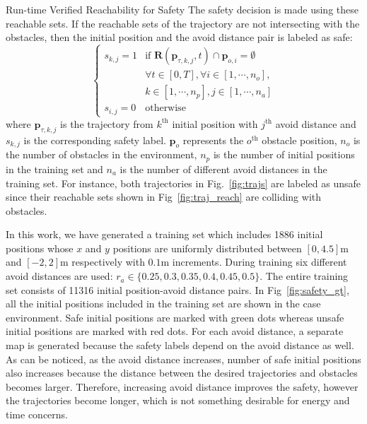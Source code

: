 \begin{section}{Run-time Verified Reachability for Safety}
The safety decision is made using these reachable sets. If the reachable sets of the trajectory are not intersecting with the obstacles, then the initial position and the avoid distance pair is labeled as safe:
\begin{equation}
	\begin{cases}
		s_{k,j} = 1 & \text{if   }  \boldsymbol{R}(\boldsymbol{p}_{\tau, k, j},t) \cap \boldsymbol{p}_{o,i} = \emptyset \\ 
		& \forall t \in [0,T], \forall i \in [1, \cdots, n_o], \\ 
		& k \in [1, \cdots, n_p], j \in  [1, \cdots, n_a] \\
		s_{i,j} = 0 & \text{otherwise}
 	\end{cases}
 	\label{eq:safety}
\end{equation}
where $ \boldsymbol{p}_{\tau,k,j} $ is the trajectory from $ k^{\text{th}} $ initial position with $ j^{\text{th}} $ avoid distance and $ s_{k,j} $ is the corresponding safety label. $ \boldsymbol{p}_o $ represents the $ o^\text{th} $ obstacle position, $ n_o $ is the number of obstacles in the environment, $ n_p $ is the number of initial positions in the training set and $ n_a $ is the number of different avoid distances in the training set. For instance, both trajectories in Fig.~\ref{fig:trajs} are labeled as unsafe since their reachable sets shown in Fig~\ref{fig:traj_reach} are colliding with obstacles.

In this work, we have generated a training set which includes 1886 initial positions whose $ x $ and $ y $ positions are uniformly distributed between $ [0,4.5] $m and $ [-2,2] $m respectively with $ 0.1 $m increments. During training six different avoid distances are used: $ r_a \in \{0.25, 0.3, 0.35, 0.4, 0.45, 0.5\} $. The entire training set consists of 11316 initial position-avoid distance pairs. In Fig~\ref{fig:safety_gt}, all the initial positions included in the training set are shown in the case environment. Safe initial positions are marked with green dots whereas unsafe initial positions are marked with red dots. For each avoid distance, a separate map is generated because the safety labels depend on the avoid distance as well. As can be noticed, as the avoid distance increases, number of safe initial positions also increases because the distance between the desired trajectories and obstacles becomes larger. Therefore, increasing avoid distance improves the safety, however the trajectories become longer, which is not something desirable for energy and time concerns.


\end{section}
